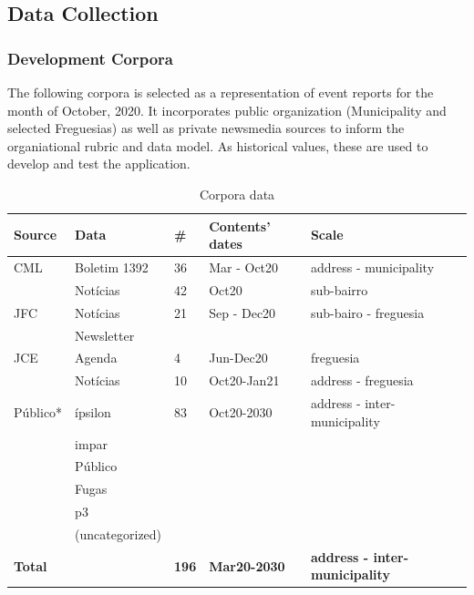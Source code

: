 \subsection{Data Collection}
\subsubsection{Development Corpora}
The following corpora is selected as a representation of event reports for the month of October, 2020. It incorporates public organization (Municipality and selected Freguesias) as well as private newsmedia sources to inform the organiational rubric and data model.  As historical values, these are used to develop and test the application.


\begin{table} [H]
		\centering
		\begin{tabular}{| l l l l l |}
			\hline
			Source & Data & \# & Contents' dates & Scale \\ 
			\hline
			\hline
			CML & Boletim 1392 & 36 & Mar - Oct20 & address - municipality \\ 
			 & Notícias & 42 & {\color{red}Oct20}  & {\color{red}sub-bairro} \\ 
			 \hline
			JFC & Notícias & 21 & Sep - Dec20 & sub-bairo - freguesia \\
			& Newsletter & && \\
			\hline
			JCE & Agenda & 4 & Jun-Dec20 & freguesia \\
			 & Notícias & 10 & Oct20-Jan21& address - freguesia \\
			 \hline
			Público* & ípsilon & 83 & {\color{red}Oct20-2030} & {\color{red}address - inter-municipality} \\
			& impar  &  &  &  \\
			& Público  &  &  &  \\
			& Fugas &  &  &  \\
			& p3  &  &  &  \\
			& (uncategorized)  &  &  &  \\
			\hline
			\hline
			\textbf{Total} & \textbf{} & \textbf{{\color{red}196}} & \textbf{{\color{red}Mar20-2030}} & \textbf{{\color{red}address - inter-municipality}} \\
			\hline
		\end{tabular}
		\caption{Corpora data}
		\label{table:data_corpora}
\end{table}

